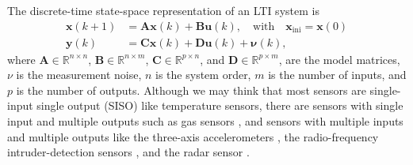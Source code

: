The discrete-time state-space representation of an LTI system is
\begin{equation} \begin{aligned} \mathbf{x}(k+1) &= \mathbf{A} \mathbf{x}(k) + \mathbf{B} \mathbf{u}(k), \quad \text{with} \quad \mathbf{x}_{\text{ini}} = \mathbf{x}(0) \\ 
\mathbf{y}(k) &= \mathbf{C} \mathbf{x}(k) + \mathbf{D} \mathbf{u}(k) + \mathbf{\nu}(k),  \label{eqn:dtsslti} \end{aligned} \end{equation}
where $\mathbf{A} \in \mathbb{R}^{n \times n}$, $\mathbf{B} \in \mathbb{R}^{n \times m}$, $\mathbf{C} \in \mathbb{R}^{p \times n}$, and $\mathbf{D} \in \mathbb{R}^{p \times m}$, are the model matrices, $\nu$ is the measurement noise, $n$ is the system order, $m$ is the number of inputs, and $p$ is the number of outputs.
Although we may think that most sensors are single-input single output (SISO) like temperature sensors, there are sensors with single input and multiple outputs such as gas sensors \citep{Munther19}, and sensors with multiple inputs and multiple outputs like the three-axis accelerometers \citep{DEmilia16}, the radio-frequency intruder-detection sensors \citep{Ushiki13}, and the radar sensor \citep{Kueppers17}.

